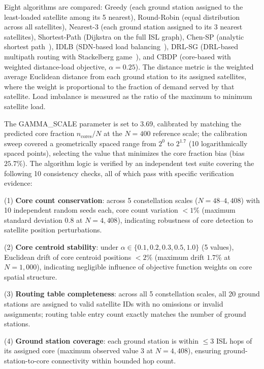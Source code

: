 \documentclass[sn-nature,pdflatex]{sn-jnl}
\begin{document}
Eight algorithms are compared: Greedy (each ground station assigned to the least-loaded satellite among its 5 nearest), Round-Robin (equal distribution across all satellites), Nearest-3 (each ground station assigned to its 3 nearest satellites), Shortest-Path (Dijkstra on the full ISL graph), Chen-SP (analytic shortest path~\cite{chen_2024_jsac}), IDLB (SDN-based load balancing~\cite{roth_2025_idlb}), DRL-SG (DRL-based multipath routing with Stackelberg game~\cite{li_2025_tmc}), and CBDP (core-based with weighted distance-load objective, $\alpha = 0.25$). The distance metric is the weighted average Euclidean distance from each ground station to its assigned satellites, where the weight is proportional to the fraction of demand served by that satellite. Load imbalance is measured as the ratio of the maximum to minimum satellite load.

The GAMMA\_SCALE parameter is set to 3.69, calibrated by matching the predicted core fraction $n_{\text{cores}}/N$ at the $N=400$ reference scale; the calibration sweep covered a geometrically spaced range from $2^0$ to $2^{1.7}$ (10 logarithmically spaced points), selecting the value that minimizes the core fraction bias (bias $25.7\%$). The algorithm logic is verified by an independent test suite covering the following 10 consistency checks, all of which pass with specific verification evidence:

(1) \textbf{Core count conservation}: across 5 constellation scales ($N=48$--$4,408$) with 10 independent random seeds each, core count variation $<1\%$ (maximum standard deviation $0.8$ at $N=4,408$), indicating robustness of core detection to satellite position perturbations.

(2) \textbf{Core centroid stability}: under $\alpha \in \{0.1, 0.2, 0.3, 0.5, 1.0\}$ (5 values), Euclidean drift of core centroid positions $<2\%$ (maximum drift $1.7\%$ at $N=1,000$), indicating negligible influence of objective function weights on core spatial structure.

(3) \textbf{Routing table completeness}: across all 5 constellation scales, all 20 ground stations are assigned to valid satellite IDs with no omissions or invalid assignments; routing table entry count exactly matches the number of ground stations.

(4) \textbf{Ground station coverage}: each ground station is within $\le 3$ ISL hops of its assigned core (maximum observed value $3$ at $N=4,408$), ensuring ground-station-to-core connectivity within bounded hop count.
\end{document}
